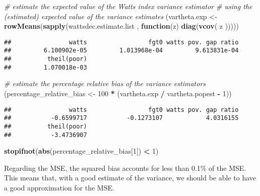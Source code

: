 \documentclass[
]{book}
\newenvironment{Shaded}{\begin{snugshade}}{\end{snugshade}}
\newcommand{\CommentTok}[1]{\textcolor[rgb]{0.56,0.35,0.01}{\textit{#1}}}
\newcommand{\ControlFlowTok}[1]{\textcolor[rgb]{0.13,0.29,0.53}{\textbf{#1}}}
\newcommand{\DecValTok}[1]{\textcolor[rgb]{0.00,0.00,0.81}{#1}}
\newcommand{\FunctionTok}[1]{\textcolor[rgb]{0.13,0.29,0.53}{\textbf{#1}}}
\newcommand{\NormalTok}[1]{#1}
\newcommand{\OtherTok}[1]{\textcolor[rgb]{0.56,0.35,0.01}{#1}}
\newcommand{\SpecialCharTok}[1]{\textcolor[rgb]{0.81,0.36,0.00}{\textbf{#1}}}
\begin{document}
\begin{Shaded}
\begin{Highlighting}[]
\CommentTok{\# estimate the expected value of the Watts index variance estimator}
\CommentTok{\# using the (estimated) expected value of the variance estimates}
\NormalTok{(vartheta.exp }\OtherTok{\textless{}{-}}
    \FunctionTok{rowMeans}\NormalTok{(}\FunctionTok{sapply}\NormalTok{(wattsdec.estimate.list , }\ControlFlowTok{function}\NormalTok{(z)}
      \FunctionTok{diag}\NormalTok{(}\FunctionTok{vcov}\NormalTok{(}
\NormalTok{        z}
\NormalTok{      )))))}
\end{Highlighting}
\end{Shaded}

\begin{verbatim}
##                watts                 fgt0 watts pov. gap ratio 
##         6.100902e-05         1.013968e-04         9.613831e-04 
##          theil(poor) 
##         1.070018e-03
\end{verbatim}

\begin{Shaded}
\begin{Highlighting}[]
\CommentTok{\# estimate the percentage relative bias of the variance estimators}
\NormalTok{(percentage\_relative\_bias }\OtherTok{\textless{}{-}}
    \DecValTok{100} \SpecialCharTok{*}\NormalTok{  (vartheta.exp }\SpecialCharTok{/}\NormalTok{ vartheta.popest }\SpecialCharTok{{-}} \DecValTok{1}\NormalTok{))}
\end{Highlighting}
\end{Shaded}

\begin{verbatim}
##                watts                 fgt0 watts pov. gap ratio 
##           -0.6599717           -0.1273107            4.0316155 
##          theil(poor) 
##           -3.4736907
\end{verbatim}

\begin{Shaded}
\begin{Highlighting}[]
\FunctionTok{stopifnot}\NormalTok{(}\FunctionTok{abs}\NormalTok{(percentage\_relative\_bias[}\DecValTok{1}\NormalTok{]) }\SpecialCharTok{\textless{}} \DecValTok{1}\NormalTok{)}
\end{Highlighting}
\end{Shaded}

Regarding the MSE, the squared bias accounts for less than 0.1\% of the MSE.
This means that, with a good estimate of the variance, we should be able to have a good approximation for the MSE.
\end{document}
